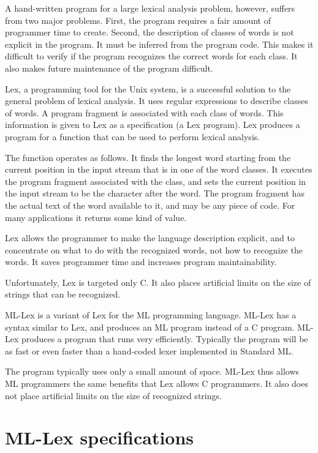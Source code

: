 A hand-written program for a large lexical analysis problem, however,
suffers from two major problems.  First, the program requires a fair
amount of programmer time to create.  Second, the description of
classes of words is not explicit in the program.  It must be inferred
from the program code.  This makes it difficult to verify if the
program recognizes the correct words for each class.  It also makes
future maintenance of the program difficult.

Lex, a programming tool for the Unix system, is a successful solution
to the general problem of lexical analysis.  It uses regular
expressions to describe classes of words.  A program fragment is
associated with each class of words.  This information is given to
Lex as a specification (a Lex program).  Lex produces a program for a
function that can be used to perform lexical analysis.

The function operates as follows.  It finds the longest word starting
from the current position in the input stream that is in one of the
word classes.  It executes the program fragment associated with the
class, and sets the current position in the input stream to be the
character after the word.  The program fragment has the actual text
of the word available to it, and may be any piece of code.  For many
applications it returns some kind of value.

Lex allows the programmer to make the language description explicit,
and to concentrate on what to do with the recognized words, not how
to recognize the words.  It saves programmer time and increases
program maintainability.

Unfortunately, Lex is targeted only C.  It also places artificial 
limits on the size of strings that can be recognized.

ML-Lex is a variant of Lex for the ML programming language.  ML-Lex
has a syntax similar to Lex, and produces an ML program instead of a
C program.  ML-Lex produces a program that runs very efficiently.
Typically the program will be as fast or even faster than a
hand-coded lexer implemented in Standard ML.

The program typically uses only a small amount of space.
ML-Lex thus allows ML programmers the same benefits that Lex allows C
programmers.  It also does not place artificial limits on the size of
recognized strings.

\section{ML-Lex specifications}

